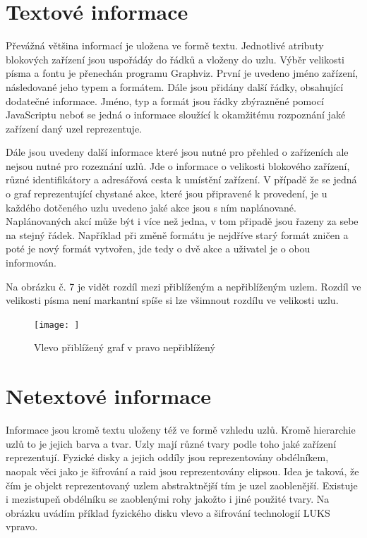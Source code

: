 \documentclass[color,table,oneside,nolot,nolof]{fithesis}
\begin{document}
\section{Textové informace}
  Převážná většina informací je uložena ve formě textu. Jednotlivé atributy blokových zařízení jsou uspořádáy do řádků a vloženy do uzlu. Výběr velikosti
	písma a fontu je přenechán programu Graphviz. První je uvedeno jméno zařízení, následované jeho typem a formátem. Dále jsou přidány další řádky, 
	obsahující dodatečné informace. Jméno, typ a formát jsou řádky zbýrazněné pomocí JavaScriptu neboť se jedná o informace sloužící k okamžitému rozpoznání
	jaké zařízení daný uzel reprezentuje.

	Dále jsou uvedeny další informace které jsou nutné pro přehled o zařízeních ale nejsou nutné pro rozeznání uzlů. Jde o informace o velikosti blokového
	zařízení, různé identifikátory a adresářová cesta k umístění zařízení. V případě že se jedná o graf reprezentující chystané akce, které jsou připravené
	k provedení, je u každého dotčeného uzlu uvedeno jaké akce jsou s ním naplánované. Naplánovaných akcí může být i více než jedna, v tom připadě jsou
	řazeny za sebe na stejný řádek. Například při změně formátu je nejdříve starý formát zničen a poté je nový formát vytvořen, jde tedy o dvě akce a 
	uživatel je o obou informován.

  Na obrázku č. 7 je vidět rozdíl mezi přiblíženým a nepřiblíženým uzlem. Rozdíl ve velikosti písma není markantní spíše si lze všimnout rozdílu ve velikosti 
	uzlu.

\begin{figure}[hb]
	\label{fig:Rozdíly uzlů}
	\caption{Vlevo přiblížený graf v pravo nepřiblížený}
	\centering
	\texttt{[image: ]}
\end{figure}
  
\section{Netextové informace}
  Informace jsou kromě textu uloženy též ve formě vzhledu uzlů. Kromě hierarchie uzlů to je jejich barva a tvar. Uzly mají různé tvary podle toho
	jaké zařízení reprezentují. Fyzické disky a jejich oddíly jsou reprezentovány obdélníkem, naopak věci jako je šifrování a raid jsou reprezentovány
	elipsou. Idea je taková, že čím je objekt reprezentovaný uzlem abstraktnější tím je uzel zaoblenější. Existuje i mezistupeň obdélníku se zaoblenými
	rohy jakožto i jiné použité tvary. Na obrázku uvádím příklad fyzického disku vlevo a šifrování technologií LUKS vpravo.
\end{document}
